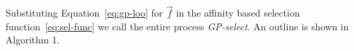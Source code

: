 Substituting Equation~\eqref{eq:gp-loo} for $\vec{f}$ in the affinity based selection function~\eqref{eq:sel-func} 
we call the entire process \textit{GP-select}. An outline is shown in Algorithm 1.

%
%
%

%

